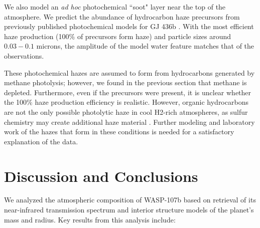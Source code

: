 \documentclass[twocolumn, trackchanges]{aastex61}
\begin{document}
We also model an \emph{ad hoc} photochemical ``soot" layer near the top of the atmosphere. We predict the abundance of hydrocarbon haze precursors from previously published photochemical models for GJ 436b \citep{line11, morley17}. With the most efficient haze production (100\% of precursors form haze) and particle sizes around $0.03-0.1$ microns, the amplitude of the model water feature matches that of the observations. 

These photochemical hazes are assumed to form from hydrocarbons generated by methane photolysis; however, we found in the previous section that methane is depleted.  Furthermore, even if the precursors were present, it is unclear whether the 100\% haze production efficiency is realistic.  However, organic hydrocarbons are not the only possible photolytic haze in cool H2-rich atmospheres, as sulfur chemistry may create additional haze material \citep{zahnle09, gao17}. Further modeling and laboratory work of the hazes that form in these conditions is needed for a satisfactory explanation of the data.  

\section{Discussion and Conclusions} \label{sec:discuss}
We analyzed the atmospheric composition of WASP-107b based on retrieval of its near-infrared transmission spectrum and interior structure models of the planet's mass and radius.  Key results from this analysis include:
\end{document}
